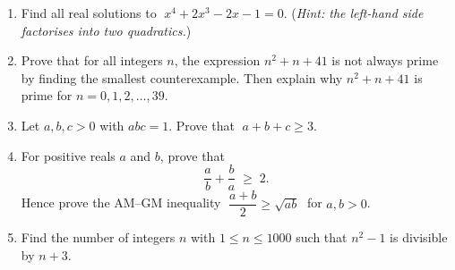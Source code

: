 \documentclass[11pt,a4paper]{article}
\begin{document}
\begin{enumerate}

\item Find all real solutions to $\;x^4+2x^3-2x-1=0$.
      (\textit{Hint: the left-hand side factorises into two quadratics.})

\item Prove that for all integers $n$, the expression $n^2+n+41$ is not always prime
      by finding the smallest counterexample. Then explain why $n^2+n+41$ is prime
      for $n=0,1,2,\ldots,39$.

\item Let $a,b,c>0$ with $abc=1$. Prove that $\;a+b+c\geq3$.

\item For positive reals $a$ and $b$, prove that
\[
  \frac{a}{b}+\frac{b}{a}\;\geq\;2.
\]
Hence prove the AM--GM inequality $\;\dfrac{a+b}{2}\geq\sqrt{ab}\;$ for $a,b>0$.

\item Find the number of integers $n$ with $1\leq n\leq 1000$ such that $n^2-1$ is
      divisible by $n+3$.

\end{enumerate}

\end{document}
